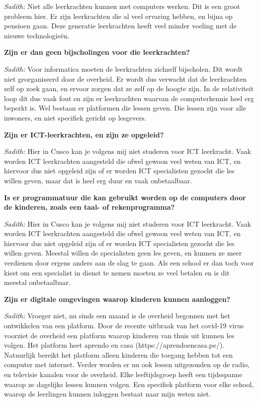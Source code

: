 \textit{Sadith:} Niet alle leerkrachten kunnen met computers werken. Dit is een groot probleem hier. Er zijn leerkrachten die al veel ervaring hebben, en bijna op pensioen gaan. Deze generatie leerkrachten heeft veel minder voeling met de nieuwe technologieën.

\textbf{Zijn er dan geen bijscholingen voor die leerkrachten?}

\textit{Sadith:} Voor informatica moeten de leerkrachten zichzelf bijscholen. Dit wordt niet georganiseerd door de overheid. Er wordt dus verwacht dat de leerkrachten zelf op zoek gaan, en ervoor zorgen dat ze zelf op de hoogte zijn. In de relativiteit loop dit dus vaak fout en zijn er leerkrachten waarvan de computerkennis heel erg beperkt is. Wel bestaan er platformen die lessen geven. Die lessen zijn voor alle inwoners, en niet specifiek gericht op lesgevers.

\textbf{Zijn er ICT-leerkrachten, en zijn ze opgeleid?}

\textit{Sadith:} Hier in Cusco kan je volgens mij niet studeren voor ICT leerkracht. Vaak worden ICT leerkrachten aangesteld die ofwel gewoon veel weten van ICT, en hiervoor dus niet opgeleid zijn of er worden ICT specialisten gezocht die les willen geven, maar dat is heel erg duur en vaak onbetaalbaar.

\textbf{Is er programmatuur die kan gebruikt worden op de computers door de kinderen, zoals een taal- of rekenprogramma?}

\textit{Sadith:} Hier in Cusco kan je volgens mij niet studeren voor ICT leerkracht. Vaak worden ICT leerkrachten aangesteld die ofwel gewoon veel weten van ICT, en hiervoor dus niet opgeleid zijn of er worden ICT specialisten gezocht die les willen geven. Meestal willen de specialisten geen les geven, en kunnen ze meer verdienen door ergens anders aan de slag te gaan. Als een school er dan toch voor kiest om een specialist in dienst te nemen moeten ze veel betalen en is dit meestal onbetaalbaar.
	
\textbf{Zijn er digitale omgevingen waarop kinderen kunnen aanloggen?}

\textit{Sadith:} Vroeger niet, nu sinds een maand is de overheid begonnen met het ontwikkelen van een platform. Door de recente uitbraak van het covid-19 virus voorziet de overheid een platform waarop kinderen van thuis uit kunnen les volgen. Het platform heet aprendo en casa (https://aprendoencasa.pe/). Natuurlijk bereikt het platform alleen kinderen die toegang hebben tot een computer met internet. Verder worden er nu ook lessen uitgezonden op de radio, en televisie kanalen voor de overheid. Elke leeftijdsgroep heeft een tijdsspanne waarop ze dagelijks lessen kunnen volgen. Een specifiek platform voor elke school, waarop de leerlingen kunnen inloggen bestaat naar mijn weten niet. 

